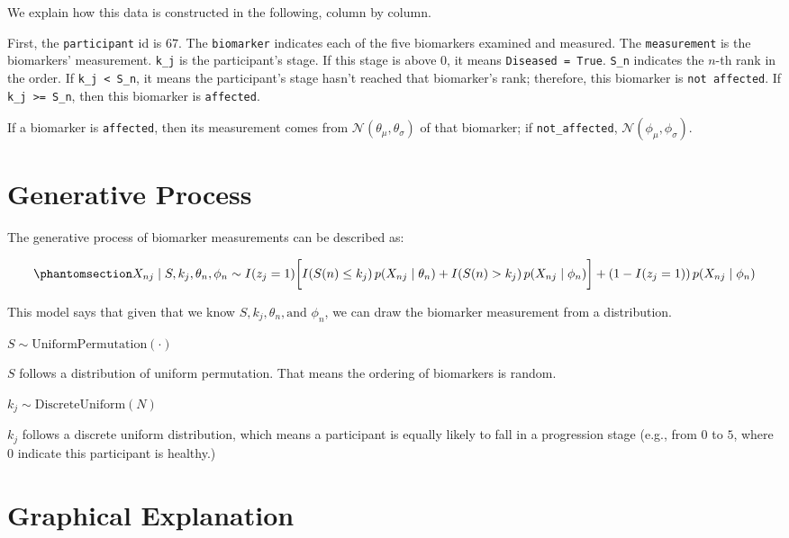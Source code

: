 \documentclass[
  letterpaper,
  DIV=11,
  numbers=noendperiod]{scrreprt}
\begin{document}
We explain how this data is constructed in the following, column by
column.

First, the \texttt{participant} id is \(67\). The \texttt{biomarker}
indicates each of the five biomarkers examined and measured. The
\texttt{measurement} is the biomarkers' measurement. \texttt{k\_j} is
the participant's stage. If this stage is above 0, it means
\texttt{Diseased\ =\ True}. \texttt{S\_n} indicates the \(n\)-th rank in
the order. If \texttt{k\_j\ \textless{}\ S\_n}, it means the
participant's stage hasn't reached that biomarker's rank; therefore,
this biomarker is \texttt{not\ affected}. If
\texttt{k\_j\ \textgreater{}=\ S\_n}, then this biomarker is
\texttt{affected}.

If a biomarker is \texttt{affected}, then its measurement comes from
\(\mathcal N(\theta_{\mu}, \theta_{\sigma})\) of that biomarker; if
\texttt{not\_affected}, \(\mathcal N(\phi_{\mu}, \phi_{\sigma})\).

\section{Generative Process}\label{generative-process}

The generative process of biomarker measurements can be described as:

\begin{equation}\phantomsection\label{eq-gen}{
X_{nj} \mid S, k_j, \theta_n, \phi_n \sim I(z_j = 1) \bigg[ I(S(n) \leq k_j) \, p(X_{nj} \mid \theta_{n}) + I(S(n) > k_j) \, p(X_{nj} \mid \phi_{n}) \bigg] \\
+ \left(1 - I(z_j = 1) \right) p(X_{nj} \mid \phi_{n})
}\end{equation}

This model says that given that we know
\(S, k_j, \theta_n, \text{and } \phi_n\), we can draw the biomarker
measurement from a distribution.

\(S \sim \mathrm{UniformPermutation}(\cdot)\)

\(S\) follows a distribution of uniform permutation. That means the
ordering of biomarkers is random.

\(k_j \sim \mathrm{DiscreteUniform}(N)\)

\(k_j\) follows a discrete uniform distribution, which means a
participant is equally likely to fall in a progression stage (e.g., from
\(0\) to \(5\), where \(0\) indicate this participant is healthy.)

\section{Graphical Explanation}\label{graphical-explanation}
\end{document}
